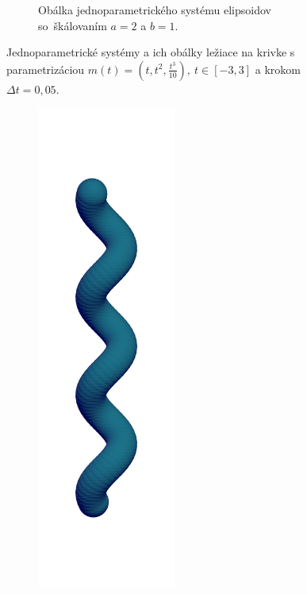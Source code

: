 \begin{figure}[h]
\begin{subfigure}[t]{0.49\textwidth}
        	\caption{Obálka jednoparametrického systému elipsoidov so~škálovaním $a=2$ a $b=1$.}
        \label{fig:plocha6}
    \end{subfigure}
    	\caption[Jednoparametrické systémy a ich obálky ležiace na krivke Bienert.]{Jednoparametrické systémy a ich obálky ležiace na krivke s parametrizáciou  $m(t)=(t, t^2, \frac{t^3}{10}), \  t \in [-3, 3]$ a krokom $\Delta t = 0,05$.}
    \label{fig:katalogI}
\end{figure}

\begin{figure}[t!]
	\captionsetup{justification=centering}
	\captionsetup[subfigure]{justification=centering}
    \begin{subfigure}[t]{0.32\textwidth}
        \centering
        \includegraphics[width=0.5\textwidth]{images/helix_spheres.png}

\end{subfigure}
\end{figure}
